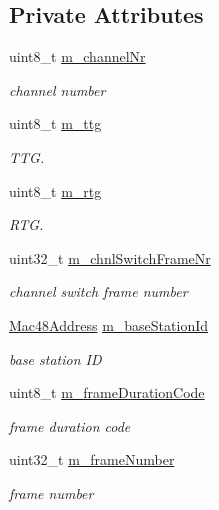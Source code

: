 \subsection*{Private Attributes}
\begin{DoxyCompactItemize}
\item 
uint8\+\_\+t \hyperlink{classns3_1_1OfdmDcdChannelEncodings_a364d0f938f94b6b0abebd70c0150b464}{m\+\_\+channel\+Nr}
\begin{DoxyCompactList}\small\item\em channel number \end{DoxyCompactList}\item 
uint8\+\_\+t \hyperlink{classns3_1_1OfdmDcdChannelEncodings_aa9d4e4da0c45006c879615575330780c}{m\+\_\+ttg}
\begin{DoxyCompactList}\small\item\em T\+TG. \end{DoxyCompactList}\item 
uint8\+\_\+t \hyperlink{classns3_1_1OfdmDcdChannelEncodings_af8ca00fe9ad2c476fb9afafb07cdad0f}{m\+\_\+rtg}
\begin{DoxyCompactList}\small\item\em R\+TG. \end{DoxyCompactList}\item 
uint32\+\_\+t \hyperlink{classns3_1_1OfdmDcdChannelEncodings_a87a70ee21def772db3e3869cfc3be7f2}{m\+\_\+chnl\+Switch\+Frame\+Nr}
\begin{DoxyCompactList}\small\item\em channel switch frame number \end{DoxyCompactList}\item 
\hyperlink{classns3_1_1Mac48Address}{Mac48\+Address} \hyperlink{classns3_1_1OfdmDcdChannelEncodings_abf382f537e8c43b75989587dc623d64e}{m\+\_\+base\+Station\+Id}
\begin{DoxyCompactList}\small\item\em base station ID \end{DoxyCompactList}\item 
uint8\+\_\+t \hyperlink{classns3_1_1OfdmDcdChannelEncodings_a7061c3414c14bff6fe1f2ec7a2ea4d2b}{m\+\_\+frame\+Duration\+Code}
\begin{DoxyCompactList}\small\item\em frame duration code \end{DoxyCompactList}\item 
uint32\+\_\+t \hyperlink{classns3_1_1OfdmDcdChannelEncodings_aa0149a49b5de7796808bc89a1602342f}{m\+\_\+frame\+Number}
\begin{DoxyCompactList}\small\item\em frame number \end{DoxyCompactList}\end{DoxyCompactItemize}



